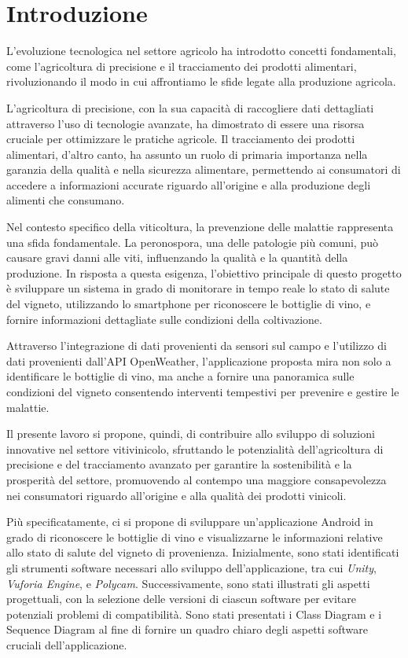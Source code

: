 {}
\chapter*{Introduzione}

L'evoluzione tecnologica nel settore agricolo ha introdotto concetti fondamentali, come l'agricoltura di precisione e il tracciamento dei prodotti alimentari, rivoluzionando il modo in cui affrontiamo le sfide legate alla produzione agricola.

L'agricoltura di precisione, con la sua capacità di raccogliere dati dettagliati attraverso l'uso di tecnologie avanzate, ha dimostrato di essere una risorsa cruciale per ottimizzare le pratiche agricole. Il tracciamento dei prodotti alimentari, d'altro canto, ha assunto un ruolo di primaria importanza nella garanzia della qualità e nella sicurezza alimentare, permettendo ai consumatori di accedere a informazioni accurate riguardo all'origine e alla produzione degli alimenti che consumano.

Nel contesto specifico della viticoltura, la prevenzione delle malattie rappresenta una sfida fondamentale. La peronospora, una delle patologie più comuni, può causare gravi danni alle viti, influenzando la qualità e la quantità della produzione. In risposta a questa esigenza, l'obiettivo principale di questo progetto è sviluppare un sistema in grado di monitorare in tempo reale lo stato di salute del vigneto, utilizzando lo smartphone per riconoscere le bottiglie di vino, e fornire informazioni dettagliate sulle condizioni della coltivazione.

Attraverso l'integrazione di dati provenienti da sensori sul campo e l'utilizzo di dati provenienti dall'API OpenWeather, l'applicazione proposta mira non solo a identificare le bottiglie di vino, ma anche a fornire una panoramica sulle condizioni del vigneto consentendo interventi tempestivi per prevenire e gestire le malattie.

Il presente lavoro si propone, quindi, di contribuire allo sviluppo di soluzioni innovative nel settore vitivinicolo, sfruttando le potenzialità dell'agricoltura di precisione e del tracciamento avanzato per garantire la sostenibilità e la prosperità del settore, promuovendo al contempo una maggiore consapevolezza nei consumatori riguardo all'origine e alla qualità dei prodotti vinicoli.

Più specificatamente, ci si propone di sviluppare un'applicazione Android in grado di riconoscere le bottiglie di vino e visualizzarne le informazioni relative allo stato di salute del vigneto di provenienza. Inizialmente, sono stati identificati gli strumenti software necessari allo sviluppo dell'applicazione, tra cui \textit{Unity}, \textit{Vuforia Engine}, e \textit{Polycam}. Successivamente, sono stati illustrati gli aspetti progettuali, con la selezione delle versioni di ciascun software per evitare potenziali problemi di compatibilità. Sono stati presentati i Class Diagram e i Sequence Diagram al fine di fornire un quadro chiaro degli aspetti software cruciali dell'applicazione.

